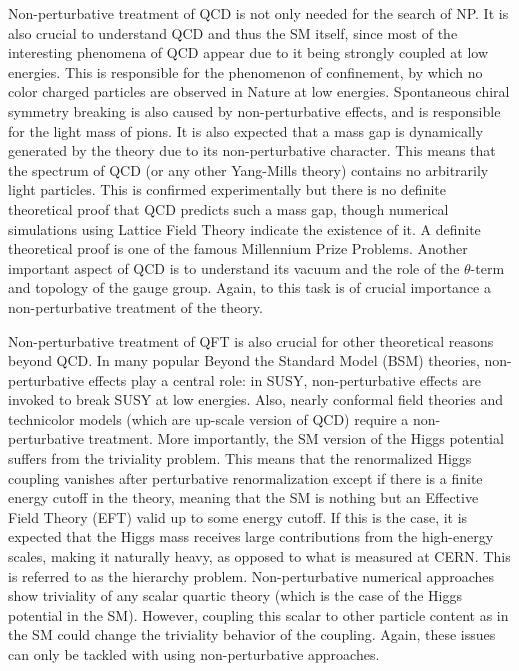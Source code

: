 Non-perturbative treatment of QCD is not only needed for the search of NP. It is also crucial to understand QCD and thus the SM itself, since most of the interesting phenomena of QCD appear due to it being strongly coupled at low energies. This is responsible for the phenomenon of confinement, by which no color charged particles are observed in Nature at low energies. Spontaneous chiral symmetry breaking is also caused by non-perturbative effects, and is responsible for the light mass of pions. It is also expected that a mass gap is dynamically generated by the theory due to its non-perturbative character. This means that the spectrum of QCD (or any other Yang-Mills theory) contains no arbitrarily light particles. This is confirmed experimentally but there is no definite theoretical proof that QCD predicts such a mass gap, though numerical simulations using Lattice Field Theory indicate the existence of it. A definite theoretical proof is one of the famous Millennium Prize Problems. Another important aspect of QCD is to understand its vacuum and the role of the $\theta$-term and topology of the gauge group. Again, to this task is of crucial importance a non-perturbative treatment of the theory.

Non-perturbative treatment of QFT is also crucial for other theoretical reasons beyond QCD. In many popular Beyond the Standard Model (BSM) theories, non-perturbative effects play a central role: in SUSY, non-perturbative effects are invoked to break SUSY at low energies. Also, nearly conformal field theories and technicolor models (which are up-scale version of QCD) require a non-perturbative treatment. More importantly, the SM version of the Higgs potential suffers from the triviality problem. This means that the renormalized Higgs coupling vanishes after perturbative renormalization except if there is a finite energy cutoff in the theory, meaning that the SM is nothing but an Effective Field Theory (EFT) valid up to some energy cutoff. If this is the case, it is expected that the Higgs mass receives large contributions from the high-energy scales, making it naturally heavy, as opposed to what is measured at CERN. This is referred to as the hierarchy problem. Non-perturbative numerical approaches show triviality of any scalar quartic theory (which is the case of the Higgs potential in the SM). However, coupling this scalar to other particle content as in the SM could change the triviality behavior of the coupling. Again, these issues can only be tackled with using non-perturbative approaches.

